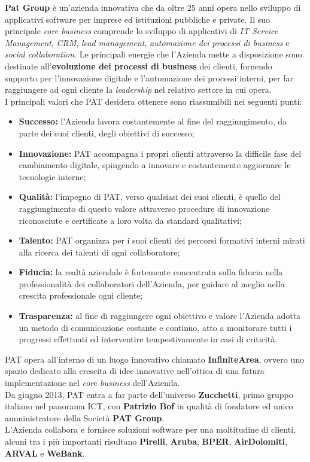 \textbf{Pat Group} è un'azienda innovativa che da oltre 25 anni opera nello sviluppo di applicativi software per imprese ed istituzioni pubbliche e private. Il suo principale \textit{core business} comprende lo sviluppo di applicativi di \textit{IT Service Management}, \textit{CRM}, \textit{lead management}, \textit{automazione dei processi di business} e \textit{social collaboration}.
Le principali energie che l'Azienda mette a disposizione sono destinate all'\textbf{evoluzione dei processi di business} dei clienti, fornendo supporto per l'innovazione digitale e l'automazione dei processi interni, per far raggiungere ad ogni cliente la \textit{leadership} nel relativo settore in cui opera.\\
I principali valori che PAT desidera ottenere sono riassumibili nei seguenti punti:
\begin{itemize}
	\item \textbf{Successo:} l'Azienda lavora costantemente al fine del raggiungimento, da parte dei suoi clienti, degli obiettivi di successo;
	\item \textbf{Innovazione:} PAT accompagna i propri clienti attraverso la difficile fase del cambiamento digitale, spingendo a innovare e costantemente aggiornare le tecnologie interne;
	\item \textbf{Qualità:} l'impegno di PAT, verso qualsiasi dei suoi clienti, è quello del raggiungimento di questo valore attraverso procedure di innovazione riconosciute e certificate a loro volta da standard qualitativi;
	\item \textbf{Talento:} PAT organizza per i suoi clienti dei percorsi formativi interni mirati alla ricerca dei talenti di ogni collaboratore;
	\item \textbf{Fiducia:} la realtà aziendale è fortemente concentrata sulla fiducia nella professionalità dei collaboratori dell'Azienda, per guidare al meglio nella crescita professionale ogni cliente;
	\newpage
	\item \textbf{Trasparenza:} al fine di raggiungere ogni obiettivo e valore l'Azienda adotta un metodo di comunicazione costante e continuo, atto a monitorare tutti i progressi effettuati ed interventire tempestivamente in casi di criticità.
\end{itemize}
PAT opera all'interno di un luogo innovativo chiamato \textbf{InfiniteArea}, ovvero uno spazio dedicato alla crescita di idee innovative nell'ottica di una futura implementazione nel \textit{core business} dell'Azienda. \\
Da giugno 2013, PAT entra a far parte dell'universo \textbf{Zucchetti}, primo gruppo italiano nel panorama ICT, con \textbf{Patrizio Bof} in qualità di fondatore ed unico amministratore della Società \textbf{PAT Group}.\\
L'Azienda collabora e fornisce soluzioni software per una moltitudine di clienti, alcuni tra i più importanti risultano \textbf{Pirelli}, \textbf{Aruba}, \textbf{BPER}, \textbf{AirDolomiti}, \textbf{ARVAL} e \textbf{WeBank}.
